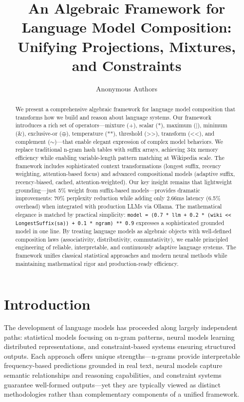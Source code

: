 \documentclass{article}
\title{An Algebraic Framework for Language Model Composition: \\ Unifying Projections, Mixtures, and Constraints}
\author{Anonymous Authors}
\date{}
\theoremstyle{definition}
\begin{document}
\maketitle

\begin{abstract}
We present a comprehensive algebraic framework for language model composition that transforms how we build and reason about language systems. Our framework introduces a rich set of operators---mixture (+), scalar (*), maximum (|), minimum (\&), exclusive-or ($\oplus$), temperature (**), threshold (>>), transform (<<), and complement ($\sim$)---that enable elegant expression of complex model behaviors. We replace traditional n-gram hash tables with suffix arrays, achieving 34x memory efficiency while enabling variable-length pattern matching at Wikipedia scale. The framework includes sophisticated context transformations (longest suffix, recency weighting, attention-based focus) and advanced compositional models (adaptive suffix, recency-biased, cached, attention-weighted). Our key insight remains that lightweight grounding---just 5\% weight from suffix-based models---provides dramatic improvements: 70\% perplexity reduction while adding only 2.66ms latency (6.5\% overhead) when integrated with production LLMs via Ollama. The mathematical elegance is matched by practical simplicity: \texttt{model = (0.7 * llm + 0.2 * (wiki << LongestSuffix(sa)) + 0.1 * ngram) ** 0.9} expresses a sophisticated grounded model in one line. By treating language models as algebraic objects with well-defined composition laws (associativity, distributivity, commutativity), we enable principled engineering of reliable, interpretable, and continuously adaptive language systems. The framework unifies classical statistical approaches and modern neural methods while maintaining mathematical rigor and production-ready efficiency.
\end{abstract}

\section{Introduction}

The development of language models has proceeded along largely independent paths: statistical models focusing on n-gram patterns, neural models learning distributed representations, and constraint-based systems ensuring structured outputs. Each approach offers unique strengths---n-grams provide interpretable frequency-based predictions grounded in real text, neural models capture semantic relationships and reasoning capabilities, and constraint systems guarantee well-formed outputs---yet they are typically viewed as distinct methodologies rather than complementary components of a unified framework.
\end{document}

